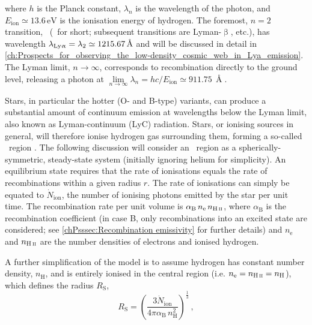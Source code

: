 \noindent where $h$ is the Planck constant, $\lambda_n$ is the wavelength of the photon, and $E_\text{ion} \simeq 13.6 \, \mathrm{eV}$ is the ionisation energy of hydrogen. The foremost, $n = 2$ transition, \lymana\ (\lya\ for short; subsequent transitions are Lyman-$\upbeta$, etc.), has wavelength $\lambda_\text{{Ly\ensuremath{\upalpha}}} = \lambda_2 \simeq 1215.67 \, \text{\AA}$ and will be discussed in detail in \cref{ch:Prospects_for_observing_the_low-density_cosmic_web_in_Lya_emission}. The Lyman limit, $n \rightarrow \infty$, corresponds to recombination directly to the ground level, releasing a photon at $\lim\limits_{n \rightarrow \infty} \lambda_n = hc/E_\text{ion} \simeq 911.75 \, \Angstrom$.

Stars, in particular the hotter (O- and B-type) variants, can produce a substantial amount of continuum emission at wavelengths below the Lyman limit, also known as Lyman-continuum (LyC) radiation. Stars, or ionising sources in general, will therefore ionise hydrogen gas surrounding them, forming a so-called \HII\ region \citep{1939ApJ....89..526S}. The following discussion will consider an \HII\ region as a spherically-symmetric, steady-state system (initially ignoring helium for simplicity). An equilibrium state requires that the rate of ionisations equals the rate of recombinations within a given radius $r$. The rate of ionisations can simply be equated to $\dot{N}_\text{ion}$, the number of ionising photons emitted by the star per unit time. The recombination rate per unit volume is $\alpha_\text{B} \, n_\text{e} \, n_\text{\HII}$, where $\alpha_\text{B}$ is the recombination coefficient (in case B, only recombinations into an excited state are considered; see \cref{chPsssec:Recombination emissivity} for further details) and $n_\text{e}$ and $n_\text{\HII}$ are the number densities of electrons and ionised hydrogen.

A further simplification of the model is to assume hydrogen has constant number density, $n_\text{H}$, and is entirely ionised in the central region (i.e. $n_\text{e} = n_\text{\HII} = n_\text{H}$), which defines the \citeauthor{1939ApJ....89..526S} radius $R_\text{S}$,
\begin{equation}
    \label{chIeq:Photoionisation_equilibrium}
    R_\text{S} = \left( \frac{3 \dot{N}_\text{ion}}{4 \pi \alpha_\text{B} \, n_\text{H}^2} \right)^\frac{1}{3} \, ,
\end{equation}


